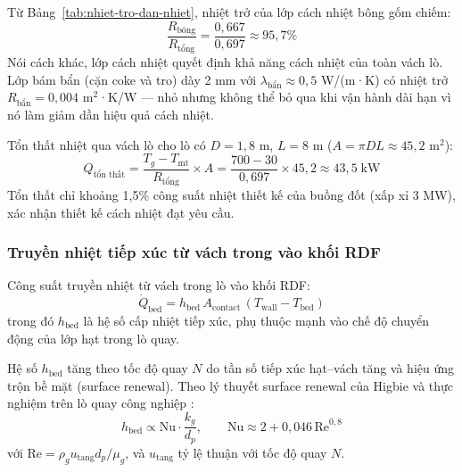 \documentclass[../main.tex]{subfiles}
\begin{document}
Từ Bảng~\ref{tab:nhiet-tro-dan-nhiet}, nhiệt trở của lớp cách nhiệt bông gốm chiếm:
\begin{equation}
  \frac{R_{\text{bông}}}{R_{\text{tổng}}} = \frac{0{,}667}{0{,}697} \approx 95{,}7\%
\end{equation}
Nói cách khác, lớp cách nhiệt quyết định khả năng cách nhiệt của toàn vách lò. Lớp bám bẩn (cặn coke và tro) dày 2 mm với $\lambda_{\text{bẩn}} \approx 0{,}5$ W/(m·K) có nhiệt trở $R_{\text{bẩn}} = 0{,}004$ m$^2$·K/W — nhỏ nhưng không thể bỏ qua khi vận hành dài hạn vì nó làm giảm dần hiệu quả cách nhiệt.

Tổn thất nhiệt qua vách lò cho lò có $D = 1{,}8$ m, $L = 8$ m ($A = \pi D L \approx 45{,}2$ m$^2$):
\begin{equation}
  Q_{\text{tổn thất}} = \frac{T_g - T_{\text{mt}}}{R_{\text{tổng}}} \times A
  = \frac{700 - 30}{0{,}697} \times 45{,}2 \approx 43{,}5 \;\text{kW}
  \label{eq:heat-loss-wall}
\end{equation}
Tổn thất chỉ khoảng 1,5\% công suất nhiệt thiết kế của buồng đốt (xấp xỉ 3 MW), xác nhận thiết kế cách nhiệt đạt yêu cầu.

\subsubsection{Truyền nhiệt tiếp xúc từ vách trong vào khối RDF}
\label{sec:truyen-nhiet-tiep-xuc}

Công suất truyền nhiệt từ vách trong lò vào khối RDF:
\begin{equation}
  \dot{Q}_{\text{bed}} = h_{\text{bed}} \, A_{\text{contact}} \, \left(T_{\text{wall}} - T_{\text{bed}}\right)
  \label{eq:bed-heat-transfer}
\end{equation}
trong đó $h_{\text{bed}}$ là hệ số cấp nhiệt tiếp xúc, phụ thuộc mạnh vào chế độ chuyển động của lớp hạt trong lò quay.

Hệ số $h_{\text{bed}}$ tăng theo tốc độ quay $N$ do tần số tiếp xúc hạt--vách tăng và hiệu ứng trộn bề mặt (surface renewal). Theo lý thuyết surface renewal của Higbie và thực nghiệm trên lò quay công nghiệp \cite{Boateng2008}:
\begin{equation}
  h_{\text{bed}} \propto \text{Nu} \cdot \frac{k_g}{d_p}, \qquad
  \text{Nu} \approx 2 + 0{,}046 \, \text{Re}^{0{,}8}
\end{equation}
với $\text{Re} = \rho_g u_{\text{tang}} d_p / \mu_g$, và $u_{\text{tang}}$ tỷ lệ thuận với tốc độ quay $N$.
\end{document}
